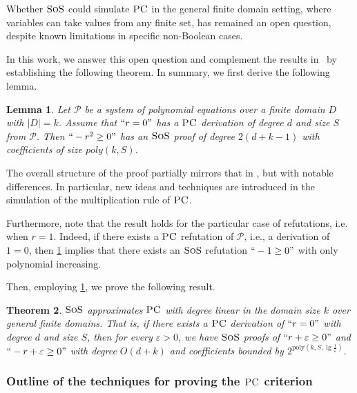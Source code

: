 \documentclass[11pt]{article}
\newcommand{\sos}{\text{\sc{SoS}}}
\newcommand{\PC}{\textsc{PC}}
\newcommand{\1}{\textbf{1}}
\newtheorem{theorem}{Theorem}[section]
\newtheorem{lemma}[theorem]{Lemma}
\begin{document}
Whether $\sos$ could simulate $\PC$ in the general finite domain setting, where variables can take values from any finite set, has remained an open question, despite known limitations in specific non-Boolean cases. 

In this work, we answer this open question and complement the results in~\cite{GrigorievV01,berkholz18} by establishing the following theorem. In summary, we first derive the following lemma.

\begin{lemma}\label{th:sos_sim_PC_introduction}
    Let $\mathcal{P}$ be a system of polynomial equations over a finite domain $D$ with $|D| = k$. Assume that $``r=0"$ has a $\PC$ derivation of degree $d$ and size $S$ from $\mathcal{P}$. Then $`` -r^2\geq 0"$ has an $\sos$ proof of degree $2(d+k-1)$ with coefficients of size $poly(k,S)$.
\end{lemma}

The overall structure of the proof partially mirrors that in \cite{berkholz18}, but with notable differences. In particular, new ideas and techniques are introduced in the simulation of the multiplication rule of \(\PC\).

Furthermore, note that the result holds for the particular case of refutations, i.e. when $r=1$. Indeed, if there exists a $\PC$ refutation of $\mathcal{P}$, i.e., a derivation of $1=0$, then \cref{th:sos_sim_PC_introduction} implies that there exists an $\sos$ refutation $``-1 \geq 0"$ with only polynomial increasing.

Then, employing \cref{th:sos_sim_PC_introduction}, we prove the following result.

\begin{theorem}\label{th:sospc_introduction}
    $\sos$ \emph{approximates} $\PC$ with degree linear in the domain size $k$ over general finite domains. That is, if there exists a \(\PC\) derivation of \( ``r=0" \) with degree \( d \) and size \( S \), then for every \( \varepsilon > 0 \), we have \(\sos\) proofs of \( ``r+\varepsilon \geq 0" \) and \( ``-r+\varepsilon \geq 0" \) with degree \( O(d+k) \) and coefficients bounded by \( 2^{\text{poly}(k, S, \lg \frac{1}{\varepsilon})} \).
\end{theorem}


\subsubsection*{Outline of the techniques for proving the $\PC$ criterion}\label{sect:outline_PC_proof}
\end{document}
